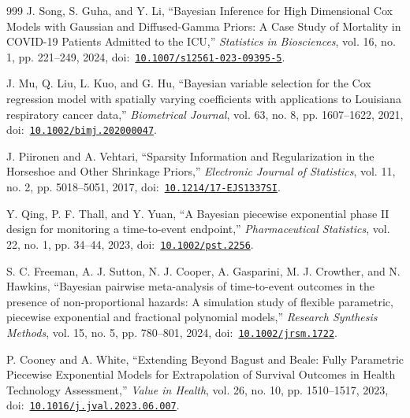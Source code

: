 \begin{thebibliography}{999}
\def\currentbiburl{https://doi.org/10.1007/s12561-023-09395-5}
 J. Song, S. Guha, and Y. Li, ``Bayesian Inference for High Dimensional Cox Models with Gaussian and Diffused-Gamma Priors: A Case Study of Mortality in COVID-19 Patients Admitted to the ICU,'' \emph{Statistics in Biosciences}, vol. 16, no. 1, pp. 221--249, 2024, doi:~\href{https://doi.org/10.1007/s12561-023-09395-5}{\nolinkurl{10.1007/s12561-023-09395-5}}.

\def\currentbiburl{https://doi.org/10.1002/bimj.202000047}
 J. Mu, Q. Liu, L. Kuo, and G. Hu, ``Bayesian variable selection for the Cox regression model with spatially varying coefficients with applications to Louisiana respiratory cancer data,'' \emph{Biometrical Journal}, vol. 63, no. 8, pp. 1607--1622, 2021, doi:~\href{https://doi.org/10.1002/bimj.202000047}{\nolinkurl{10.1002/bimj.202000047}}.

\def\currentbiburl{https://doi.org/10.1214/17-EJS1337SI}
J. Piironen and A. Vehtari, ``Sparsity Information and Regularization in the Horseshoe and Other Shrinkage Priors,'' \emph{Electronic Journal of Statistics}, vol. 11, no. 2, pp. 5018--5051, 2017, doi:~\href{https://doi.org/10.1214/17-EJS1337SI}{\nolinkurl{10.1214/17-EJS1337SI}}.

\def\currentbiburl{https://doi.org/10.1002/pst.2256}
 Y. Qing, P. F. Thall, and Y. Yuan, ``A Bayesian piecewise exponential phase II design for monitoring a time-to-event endpoint,'' \emph{Pharmaceutical Statistics}, vol. 22, no. 1, pp. 34--44, 2023, doi:~\href{https://doi.org/10.1002/pst.2256}{\nolinkurl{10.1002/pst.2256}}.

\def\currentbiburl{https://doi.org/10.1002/jrsm.1722}
 S. C. Freeman, A. J. Sutton, N. J. Cooper, A. Gasparini, M. J. Crowther, and N. Hawkins, ``Bayesian pairwise meta-analysis of time-to-event outcomes in the presence of non-proportional hazards: A simulation study of flexible parametric, piecewise exponential and fractional polynomial models,'' \emph{Research Synthesis Methods}, vol. 15, no. 5, pp. 780--801, 2024, doi:~\href{https://doi.org/10.1002/jrsm.1722}{\nolinkurl{10.1002/jrsm.1722}}.

\def\currentbiburl{https://doi.org/10.1016/j.jval.2023.06.007}
 P. Cooney and A. White, ``Extending Beyond Bagust and Beale: Fully Parametric Piecewise Exponential Models for Extrapolation of Survival Outcomes in Health Technology Assessment,'' \emph{Value in Health}, vol. 26, no. 10, pp. 1510--1517, 2023, doi:~\href{https://doi.org/10.1016/j.jval.2023.06.007}{\nolinkurl{10.1016/j.jval.2023.06.007}}.


\end{thebibliography}
